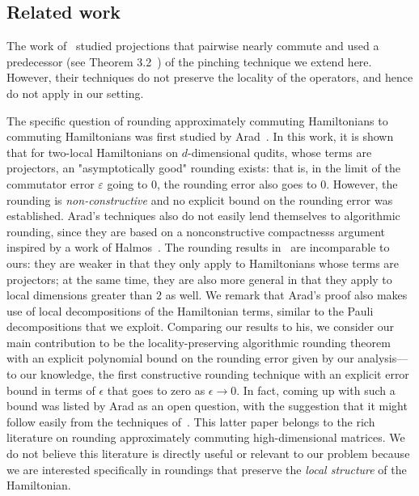 \documentclass[11pt]{article}
\theoremstyle{plain}
\newcommand{\eps}{\varepsilon}
\begin{document}
\subsection{Related work}
\label{sec:relatedwork}

The work of~\cite{overlapping} studied projections that pairwise nearly commute and used a predecessor (see Theorem 3.2~\cite{overlapping}) of the pinching technique we extend here. However, their techniques do not preserve the locality of the operators, and hence do not apply in our setting.

The specific question of rounding approximately commuting Hamiltonians to commuting Hamiltonians was first studied by Arad~\cite{arad2011notepartialnogotheorem}. In this work, it is shown that for two-local Hamiltonians on $d$-dimensional qudits, whose terms are projectors, an "asymptotically good" rounding exists: that is, in the limit of the commutator error $\eps$ going to $0$, the rounding error also goes to $0$.  However, the rounding is \emph{non-constructive} and no explicit bound on the rounding error was established. Arad's techniques also do not easily lend themselves to algorithmic rounding, since they are based on a nonconstructive compactnesss argument inspired by a work of Halmos~\cite{halmos1976some}.
The rounding results in~\cite{arad2011notepartialnogotheorem} are incomparable to ours: they are weaker in that they only apply to Hamiltonians whose terms are projectors; at the same time, they are also more general in that they apply to local dimensions greater than $2$ as well.
We remark that Arad's proof also makes use of local decompositions of the Hamiltonian terms, similar to the Pauli decompositions that we exploit. Comparing our results to his, we consider our main contribution to be the locality-preserving algorithmic rounding theorem with an explicit polynomial bound on the rounding error given by our analysis---to our knowledge, the first constructive rounding technique with an explicit error bound in terms of $\epsilon$ that goes to zero as $\epsilon \rightarrow 0$.
In fact, coming up with such a bound was listed by Arad as an open question, with the suggestion that it might follow easily from the techniques of~\cite{pearcy1979almost}. This latter paper belongs to the rich literature on rounding approximately commuting high-dimensional matrices. We do not believe this literature is directly useful or relevant to our problem because we are interested specifically in roundings that preserve the \emph{local structure} of the Hamiltonian. 
\end{document}
